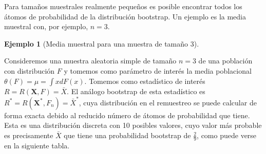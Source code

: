 \documentclass[
]{book}
\theoremstyle{break}
\theoremstyle{definition}
\theoremstyle{definition}
\newtheorem{example}{Ejemplo}[chapter]
\theoremstyle{definition}
\theoremstyle{remark}
\begin{document}
Para tamaños muestrales realmente pequeños es posible encontrar todos
los átomos de probabilidad de la distribución bootstrap. Un ejemplo es
la media muestral con, por ejemplo, \(n=3\).

\begin{example}[Media muestral para una muestra de tamaño 3]
\protect\hypertarget{exm:media3}{}{\label{exm:media3} \iffalse (Media muestral para una muestra de tamaño 3) \fi{} } \vspace{0.5cm}

Consideremos una muestra aleatoria simple de tamaño \(n=3\) de una
población con distribución \(F\) y tomemos como parámetro de interés la
media poblacional
\(\theta \left( F \right) =\mu =\int xdF\left( x \right)\).
Tomemos como estadístico de interés
\(R=R\left( \mathbf{X},F \right) =\bar{X}\).
El análogo bootstrap de esta estadístico es
\(R^{\ast}=R\left( \mathbf{X}^{\ast},F_n \right) =\bar{X}^{\ast}\),
cuya distribución en el remuestreo se puede calcular de forma exacta
debido al reducido número de átomos de probabilidad que tiene.
Esta es una distribución discreta con 10 posibles valores, cuyo
valor más probable es precisamente \(\bar{X}\) que tiene una
probabilidad bootstrap de \(\frac{2}{9}\), como puede verse en la
siguiente tabla.


\end{example}
\end{document}
